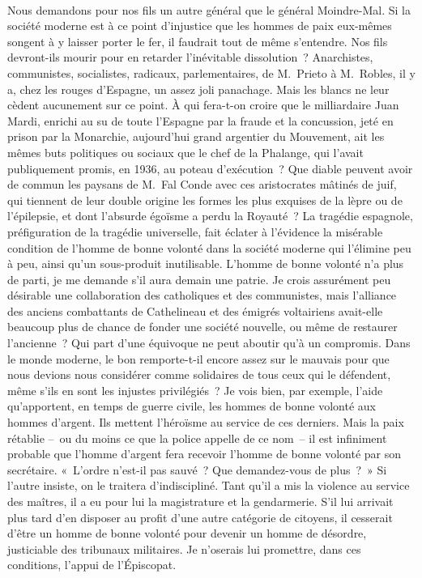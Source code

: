 \documentclass[french,twoside]{book} %
\begin{document}
\noindent  \par
Nous demandons pour nos fils un autre général que le général Moindre-Mal. Si la société moderne est à ce point d’injustice que les hommes de paix eux-mêmes songent à y laisser porter le fer, il faudrait tout de même s’entendre. Nos fils devront-ils mourir pour en retarder l’inévitable dissolution ? Anarchistes, communistes, socialistes, radicaux, parlementaires, de M. Prieto à M. Robles, il y a, chez les rouges d’Espagne, un assez joli panachage. Mais les blancs ne leur cèdent aucunement sur ce point. À qui fera-t-on croire que le milliardaire Juan Mardi, enrichi au su de toute l’Espagne par la fraude et la concussion, jeté en prison par la Monarchie, aujourd’hui grand argentier du Mouvement, ait les mêmes buts politiques ou sociaux que le chef de la Phalange, qui l’avait publiquement promis, en 1936, au poteau d’exécution ? Que diable peuvent avoir de commun les paysans de M. Fal Conde avec ces aristocrates mâtinés de juif, qui tiennent de leur double origine les formes les plus exquises de la lèpre ou de l’épilepsie, et dont l’absurde égoïsme a perdu la Royauté ? La tragédie espagnole, préfiguration de la tragédie universelle, fait éclater à l’évidence la misérable condition de l’homme de bonne volonté dans la société moderne qui l’élimine peu à peu, ainsi qu’un sous-produit inutilisable. L’homme de bonne volonté n’a plus de parti, je me demande s’il aura demain une patrie. Je crois assurément peu désirable une collaboration des catholiques et des communistes, mais l’alliance des anciens combattants de Cathelineau et des émigrés voltairiens avait-elle beaucoup plus de chance de fonder une société nouvelle, ou même de restaurer l’ancienne ? Qui part d’une équivoque ne peut aboutir qu’à un compromis. Dans le monde moderne, le bon remporte-t-il encore assez sur le mauvais pour que nous devions nous considérer comme solidaires de tous ceux qui le défendent, même s’ils en sont les injustes privilégiés ? Je vois bien, par exemple, l’aide qu’apportent, en temps de guerre civile, les hommes de bonne volonté aux hommes d’argent. Ils mettent l’héroïsme au service de ces derniers. Mais la paix rétablie – ou du moins ce que la police appelle de ce nom – il est infiniment probable que l’homme d’argent fera recevoir l’homme de bonne volonté par son secrétaire. « L’ordre n’est-il pas sauvé ? Que demandez-vous de plus ? » Si l’autre insiste, on le traitera d’indiscipliné. Tant qu’il a mis la violence au service des maîtres, il a eu pour lui la magistrature et la gendarmerie. S’il lui arrivait plus tard d’en disposer au profit d’une autre catégorie de citoyens, il cesserait d’être un homme de bonne volonté pour devenir un homme de désordre, justiciable des tribunaux militaires. Je n’oserais lui promettre, dans ces conditions, l’appui de l’Épiscopat.\par
 \par
\end{document}
